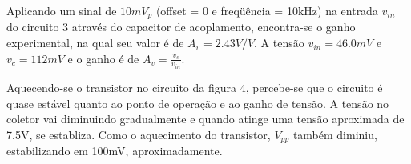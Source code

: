 \documentclass[a4paper]{article} %
\begin{document}
Aplicando um sinal de $10mV_p$ (offset = 0 e freqüência = 10kHz) na entrada $v_{in}$
do circuito 3 através do capacitor de acoplamento, encontra-se o ganho experimental, na qual seu
valor é de $A_v=2.43V/V$. A tensão  $v_{in}=46.0mV$ e  $v_c=112mV$ e o ganho é de $A_v=\frac{v_c}{v_{in}}$.

Aquecendo-se o transistor no circuito da figura 4, percebe-se que o circuito é quase
estável quanto ao ponto de operação e ao ganho de tensão. A tensão no coletor vai
diminuindo gradualmente e quando atinge uma tensão aproximada de 7.5V,
se establiza.
Como o aquecimento do transistor, $V_{pp}$ também diminiu, estabilizando em 100mV,
aproximadamente.











\end{document}
